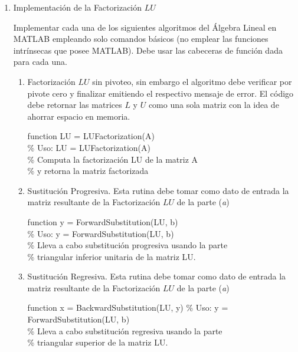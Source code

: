 \documentclass[12pt]{article}
\begin{document}
\begin{enumerate}

\item Implementaci\'on de la Factorizaci\'on $LU$

Implementar cada una de los siguientes algoritmos del \'Algebra Lineal en MATLAB empleando solo 
comandos b\'asicos (no emplear las funciones intr\'insecas que posee MATLAB). Debe usar las 
cabeceras de funci\'on dada para cada una.

\begin{enumerate}
   \item Factorizaci\'on $LU$ sin pivoteo, sin embargo el algoritmo debe verificar por pivote cero 
y finalizar emitiendo el respectivo mensaje de error. El c\'odigo debe retornar las matrices $L$ y 
$U$ como una sola matriz con la idea de ahorrar espacio en memoria.

\begin{tt}
function LU = LUFactorization(A)\\
\% Uso: LU = LUFactorization(A)\\
\% Computa la factorizaci\'on LU de la matriz A\\
\% y retorna la matriz factorizada
\end{tt}

\item Sustituci\'on Progresiva. Esta rutina debe tomar como dato de entrada la matriz resultante de 
la Factorizaci\'on $LU$ de la parte ({\it a})

\begin{tt}
   function y = ForwardSubstitution(LU, b)\\
\% Uso: y = ForwardSubstitution(LU, b)\\
\% Lleva a cabo substituci\'on progresiva usando la parte\\ 
\% triangular inferior unitaria de la matriz LU.
\end{tt}

\item Sustituci\'on Regresiva. Esta rutina debe tomar como dato de entrada la matriz resultante de 
la Factorizaci\'on $LU$ de la parte ({\it a})

\begin{tt}
function x = BackwardSubstitution(LU, y)
\% Uso: y = ForwardSubstitution(LU, b)\\
\% Lleva a cabo substituci\'on regresiva usando la parte\\ 
\% triangular superior de la matriz LU.
\end{tt}


\end{enumerate}
\end{enumerate}
\end{document}
